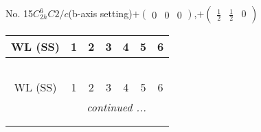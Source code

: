 \documentclass[fleqn,9pt,landscape]{jsarticle}
\begin{document}
\newpage
No. 15\quad$C_{2h}^{6}$\quad$C2/c$\quad(b-axis setting)\quad[ monoclinic ]\quad$+\begin{pmatrix} 0 & 0 & 0 \end{pmatrix}$,\quad $+\begin{pmatrix} \frac{1}{2} & \frac{1}{2} & 0 \end{pmatrix}$
\begin{center}
\renewcommand{\arraystretch}{1.2}
\begin{longtable}{ccccccc}
 \hline \hline
WL (SS) & 1 & 2 & 3 & 4 & 5 & 6 \\ \hline \endfirsthead

\multicolumn{6}{l}{\tablename\ \thetable{}} \\
 \hline \hline
WL (SS) & 1 & 2 & 3 & 4 & 5 & 6 \\ \hline \endhead

 \hline \hline
\multicolumn{6}{r}{\footnotesize\it continued ...} \\ \endfoot

 \hline \hline
\multicolumn{6}{r}{} \\ \endlastfoot


\end{longtable}
\end{center}
\end{document}
